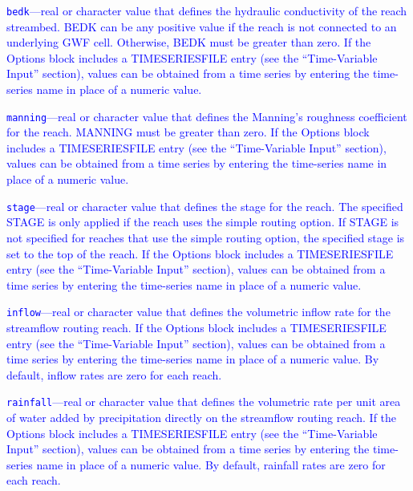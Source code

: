 \begin{description}
\item \textcolor{blue}{\texttt{bedk}---real or character value that defines the hydraulic conductivity of the reach streambed. BEDK can be any positive value if the reach is not connected to an underlying GWF cell. Otherwise, BEDK must be greater than zero. If the Options block includes a TIMESERIESFILE entry (see the ``Time-Variable Input'' section), values can be obtained from a time series by entering the time-series name in place of a numeric value.}

\item \textcolor{blue}{\texttt{manning}---real or character value that defines the Manning's roughness coefficient for the reach. MANNING must be greater than zero.  If the Options block includes a TIMESERIESFILE entry (see the ``Time-Variable Input'' section), values can be obtained from a time series by entering the time-series name in place of a numeric value.}

\item \textcolor{blue}{\texttt{stage}---real or character value that defines the stage for the reach. The specified STAGE is only applied if the reach uses the simple routing option. If STAGE is not specified for reaches that use the simple routing option, the specified stage is set to the top of the reach. If the Options block includes a TIMESERIESFILE entry (see the ``Time-Variable Input'' section), values can be obtained from a time series by entering the time-series name in place of a numeric value.}

\item \textcolor{blue}{\texttt{inflow}---real or character value that defines the volumetric inflow rate for the streamflow routing reach. If the Options block includes a TIMESERIESFILE entry (see the ``Time-Variable Input'' section), values can be obtained from a time series by entering the time-series name in place of a numeric value. By default, inflow rates are zero for each reach.}

\item \textcolor{blue}{\texttt{rainfall}---real or character value that defines the  volumetric rate per unit area of water added by precipitation directly on the streamflow routing reach. If the Options block includes a TIMESERIESFILE entry (see the ``Time-Variable Input'' section), values can be obtained from a time series by entering the time-series name in place of a numeric value. By default, rainfall  rates are zero for each reach.}


\end{description}
